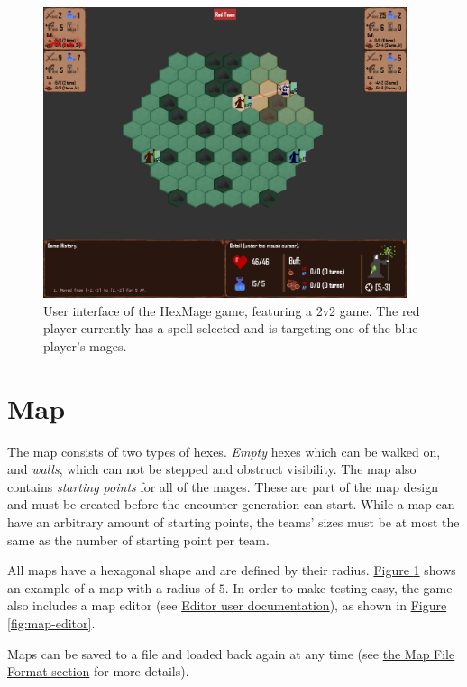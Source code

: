 \begin{figure}[h]
	\centering
	\includegraphics[width=0.95\textwidth]{img/arena.png}
	\caption{User interface of the HexMage game, featuring a 2v2 game. The red player currently has a spell selected and is targeting one of the blue player's mages.}
	\label{fig:arena}
\end{figure}

\section{Map}

The map consists of two types of hexes. \emph{Empty} hexes which can be walked on,
and \emph{walls}, which can not be stepped and obstruct visibility. The map also contains \emph{starting points}
for all of the mages. These are part of the map design and must be created before the encounter generation can start. While a map can have an arbitrary amount of starting points, the teams' sizes must be at most the same as the number of starting point per team.

All maps have a hexagonal shape and are defined by their radius. \hyperref[fig:arena]{Figure \ref*{fig:arena}} shows an example of a map with a radius of $5$. In order to make testing easy, the game also includes a map editor (see \hyperref[editor]{Editor user documentation}), as shown in \hyperref[fig:map-editor]{Figure \ref*{fig:map-editor}}.

Maps can be saved to a file and loaded back again at any time (see \hyperref[map-format]{the Map File Format section} for more details).

